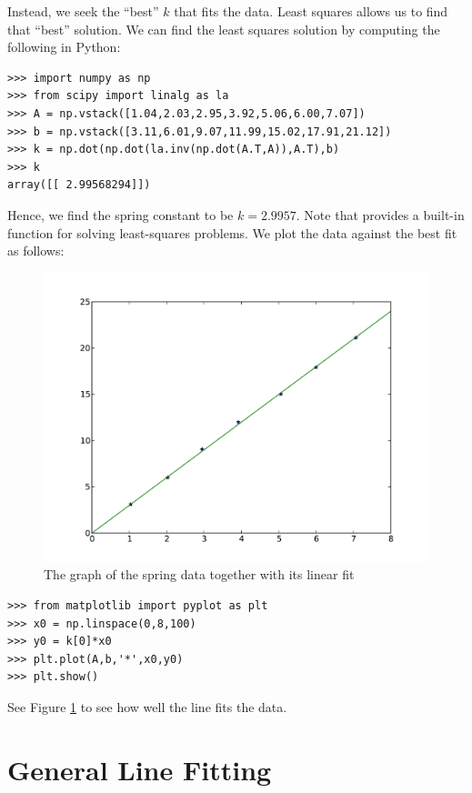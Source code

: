 Instead, we seek the ``best'' $k$ that fits the data.
Least squares allows us to find that ``best'' solution.
We can find the least squares solution by computing the following in Python:
\begin{lstlisting}
>>> import numpy as np
>>> from scipy import linalg as la
>>> A = np.vstack([1.04,2.03,2.95,3.92,5.06,6.00,7.07])
>>> b = np.vstack([3.11,6.01,9.07,11.99,15.02,17.91,21.12])
>>> k = np.dot(np.dot(la.inv(np.dot(A.T,A)),A.T),b)
>>> k
array([[ 2.99568294]])
\end{lstlisting}
Hence, we find the spring constant to be $k = 2.9957$.
Note that  provides a built-in function for solving
least-squares problems.
We plot the data against the best fit as follows:
\begin{figure}[h!]
\label{fig1}
\begin{center}
\includegraphics[width=\textwidth]{line_lstsq}
\caption{The graph of the spring data together with its linear fit}
\label{Fig:SpringFit}
\end{center}
\end{figure}

\begin{lstlisting}
>>> from matplotlib import pyplot as plt
>>> x0 = np.linspace(0,8,100)
>>> y0 = k[0]*x0
>>> plt.plot(A,b,'*',x0,y0)
>>> plt.show()
\end{lstlisting}
See Figure \ref{Fig:SpringFit} to see how well the line fits the data.


\section*{General Line Fitting}

